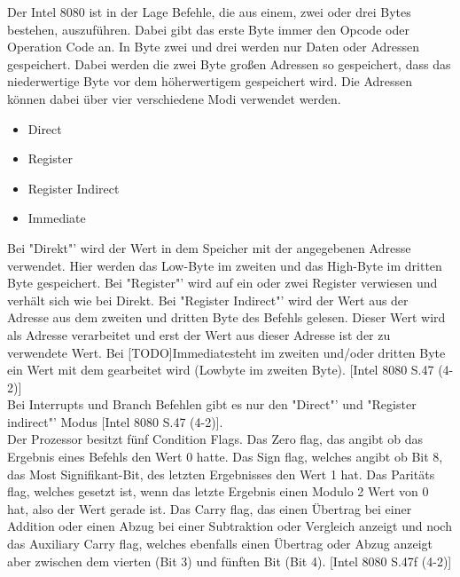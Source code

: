 \documentclass[12pt]{article}
\begin{document}
Der Intel 8080 ist in der Lage Befehle, die aus einem, zwei oder drei Bytes bestehen, auszuführen. Dabei gibt das erste Byte immer den Opcode oder Operation Code an. In Byte zwei und drei werden nur Daten oder Adressen gespeichert. Dabei werden die zwei Byte großen Adressen so gespeichert, dass das niederwertige Byte vor dem höherwertigem gespeichert wird. Die Adressen können dabei über vier verschiedene Modi verwendet werden.
\begin{itemize}
\item Direct
\item Register
\item Register Indirect
\item Immediate
\end{itemize}\noindent
Bei "Direkt"' wird der Wert in dem Speicher mit der angegebenen Adresse verwendet. Hier werden das Low-Byte im zweiten und das High-Byte im dritten Byte gespeichert. Bei "Register"' wird auf ein oder zwei Register verwiesen und verhält sich wie bei Direkt. Bei "Register Indirect"' wird der Wert aus der Adresse aus dem zweiten und dritten Byte des Befehls gelesen. Dieser Wert wird als Adresse verarbeitet und erst der Wert aus dieser Adresse ist der zu verwendete Wert. Bei [TODO]\glqq Immediate\grqq steht 
im zweiten und/oder dritten Byte ein Wert mit dem gearbeitet wird (Lowbyte im zweiten Byte). [Intel 8080 S.47 (4-2)]
\\ \noindent
Bei Interrupts und Branch Befehlen gibt es nur den "Direct"' und "Register indirect"' Modus [Intel 8080 S.47 (4-2)]. 
\\ \noindent
Der Prozessor besitzt fünf Condition Flags. Das Zero flag, das angibt ob das Ergebnis eines Befehls den Wert 0 hatte. Das Sign flag, welches angibt ob Bit 8, das Most Signifikant-Bit, des letzten Ergebnisses den Wert 1 hat. Das Paritäts flag, welches gesetzt ist, wenn das letzte Ergebnis einen Modulo 2 Wert von 0 hat, also der Wert gerade ist. Das Carry flag, das einen Übertrag bei einer Addition oder einen Abzug bei einer Subtraktion oder Vergleich anzeigt und noch das Auxiliary Carry flag, welches ebenfalls einen Übertrag oder Abzug anzeigt aber zwischen dem vierten (Bit 3) und fünften Bit (Bit 4). [Intel 8080 S.47f (4-2)]
\\
\end{document}
